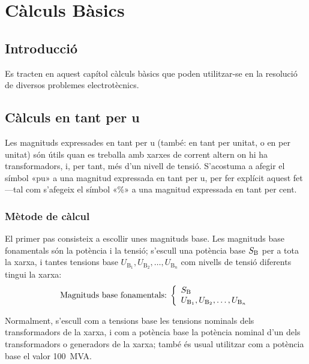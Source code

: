 
\chapter{Càlculs Bàsics}\label{sec:ch-calc-bas}

\section{Introducció}
Es tracten en aquest capítol càlculs bàsics que poden utilitzar-se en la
resolució de diversos problemes electrotècnics.



\section{Càlculs en tant per u} \label{sec:seccio_pu} 

Les magnituds expressades en tant per u (també: en tant per unitat, o en per unitat) són útils quan es treballa
amb xarxes de corrent altern on hi ha transformadors, i, per tant, més d'un nivell de tensió. S'acostuma a afegir el símbol «pu» a una magnitud expressada en tant per u,  per fer explícit aquest fet ---tal com s'afegeix el símbol «\%» a una magnitud expressada en tant per cent.

\subsection{Mètode de càlcul} 

 El primer pas consisteix a
escollir unes magnituds base. Les magnituds base fonamentals són la
potència i la tensió; s'escull una potència base $S_\mathrm{B}$ per a
tota la xarxa, i tantes tensions base $U_{\text{B}_1}, U_{\text{B}_2}, \ldots,
U_{\text{B}_n}$ com nivells de tensió
diferents tingui la xarxa:
\begin{equation}
   \text{Magnituds base fonamentals:}\;\left\{
\begin{array}{l}
   S_\mathrm{B} \\
   U_{\text{B}_1}, U_{\text{B}_2}, \ldots, U_{\text{B}_n}
\end{array}
\right.
\end{equation}

Normalment, s'escull com a tensions base les tensions nominals dels transformadors de la
xarxa, i com a potència base la potència nominal d'un dels transformadors o generadors de la xarxa; també és usual utilitzar com a potència base el valor \qty{100}{MVA}.

